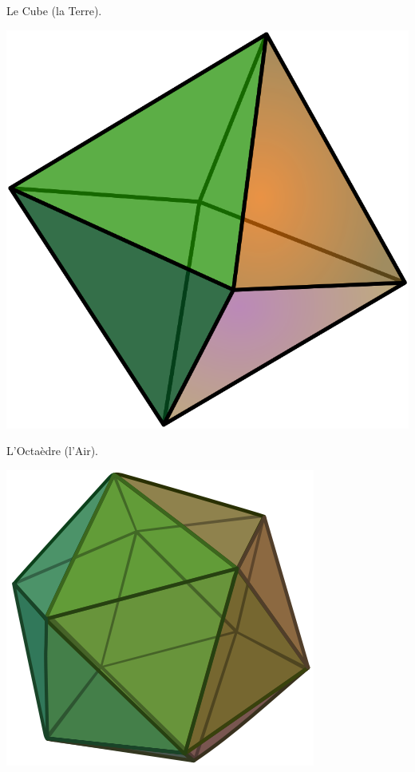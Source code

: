 {\captionsetup{type=subfigure}\caption{Le Cube (la Terre).}
\includegraphics[width=0.25\marginparwidth]{SM/Octahedron.png}
\captionsetup{type=subfigure}\caption{L'Octaèdre (l'Air).}
\includegraphics[width=0.25\marginparwidth]{SM/Icosahedron.png}
}
